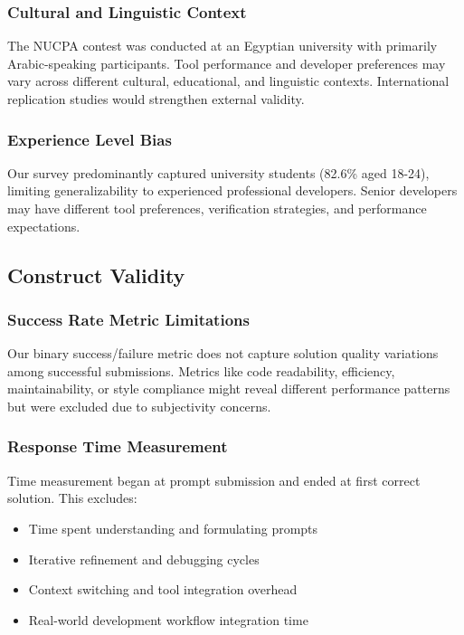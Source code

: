 \documentclass[conference]{IEEEtran}
\begin{document}
\subsubsection{Cultural and Linguistic Context}
The NUCPA contest was conducted at an Egyptian university with primarily Arabic-speaking participants. Tool performance and developer preferences may vary across different cultural, educational, and linguistic contexts. International replication studies would strengthen external validity.

\subsubsection{Experience Level Bias}
Our survey predominantly captured university students (82.6\% aged 18-24), limiting generalizability to experienced professional developers. Senior developers may have different tool preferences, verification strategies, and performance expectations.

\subsection{Construct Validity}

\subsubsection{Success Rate Metric Limitations}
Our binary success/failure metric does not capture solution quality variations among successful submissions. Metrics like code readability, efficiency, maintainability, or style compliance might reveal different performance patterns but were excluded due to subjectivity concerns.

\subsubsection{Response Time Measurement}
Time measurement began at prompt submission and ended at first correct solution. This excludes:
\begin{itemize}
    \item Time spent understanding and formulating prompts
    \item Iterative refinement and debugging cycles
    \item Context switching and tool integration overhead
    \item Real-world development workflow integration time
\end{itemize}
\end{document}
